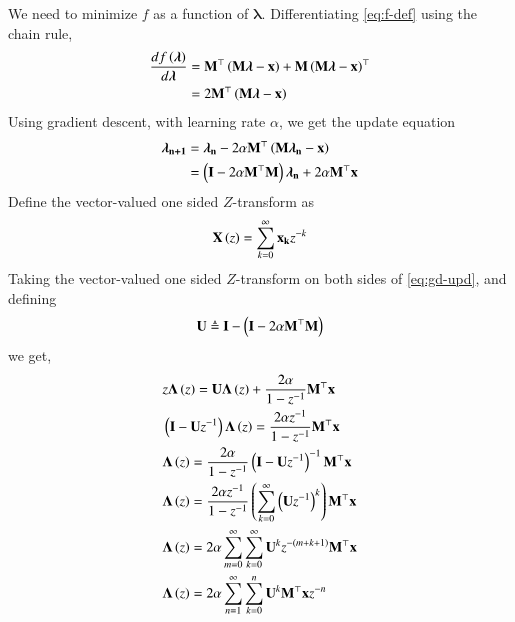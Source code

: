\documentclass[journal,12pt,twocolumn]{IEEEtran}
\renewcommand{\vec}[1]{\boldsymbol{\mathbf{#1}}}
\begin{document}
\begin{enumerate}
    We need to minimize $f$ as a function of $\vec{\lambda}$. 
    Differentiating \eqref{eq:f-def} using the chain rule,
    \begin{align}
        \frac{df\brak{\vec{\lambda}}}{d\vec{\lambda}} &= \vec{M}^\top\brak{\vec{M\lambda}-\vec{x}}+\vec{M}\brak{\vec{M\lambda}-\vec{x}}^\top \\
                                                      &= 2\vec{M}^\top\brak{\vec{M\lambda}-\vec{x}}
        \label{eq:vec-min}
    \end{align}
    Using gradient descent, with learning rate $\alpha$, we get the update
    equation
    \begin{align}
        \vec{\lambda_{n+1}} &= \vec{\lambda_n} - 2\alpha\vec{M}^\top\brak{\vec{M\lambda_n}-\vec{x}} \\
                        &= \brak{\vec{I}-2\alpha\vec{M}^\top\vec{M}}\vec{\lambda_n} + 2\alpha\vec{M}^\top\vec{x}
        \label{eq:gd-upd}
    \end{align}
    Define the vector-valued one sided $Z$-transform as
    \begin{align}
        \vec{X}\brak{z} = \sum_{k=0}^{\infty}\vec{x_k}z^{-k}
        \label{eq:Z-vec}
    \end{align}
    Taking the vector-valued one sided $Z$-transform on both sides of
    \eqref{eq:gd-upd}, and defining
    \begin{align}
        \vec{U} \triangleq \vec{I} - \brak{\vec{I}-2\alpha\vec{M}^\top\vec{M}}
        \label{eq:U-def}
    \end{align}
    we get,
    \begin{align}
        &z\vec{\Lambda}\brak{z} = \vec{U\Lambda}\brak{z} + \frac{2\alpha}{1-z^{-1}}\vec{M}^\top\vec{x} \\
        &\brak{\vec{I}-\vec{U}z^{-1}}\vec{\Lambda}\brak{z} = \frac{2\alpha z^{-1}}{1-z^{-1}}\vec{M}^\top\vec{x} \\
        &\vec{\Lambda}\brak{z} = \frac{2\alpha}{1-z^{-1}}\brak{\vec{I}-\vec{U}z^{-1}}^{-1}\vec{M}^\top\vec{x} \\
        &\vec{\Lambda}\brak{z} = \frac{2\alpha z^{-1}}{1-z^{-1}}\brak{\sum_{k=0}^{\infty}\brak{\vec{U}z^{-1}}^k}\vec{M}^\top\vec{x} \\ 
        &\vec{\Lambda}\brak{z} = 2\alpha\sum_{m=0}^{\infty}\sum_{k=0}^{\infty}\vec{U}^kz^{-(m+k+1)}\vec{M}^\top\vec{x} \label{eq:roc} \\
        &\vec{\Lambda}\brak{z} = 2\alpha\sum_{n=1}^{\infty}\sum_{k=0}^{n}\vec{U}^k\vec{M}^\top\vec{x}z^{-n} \label{eq:L-n}

\end{align}
\end{enumerate}
\end{document}
